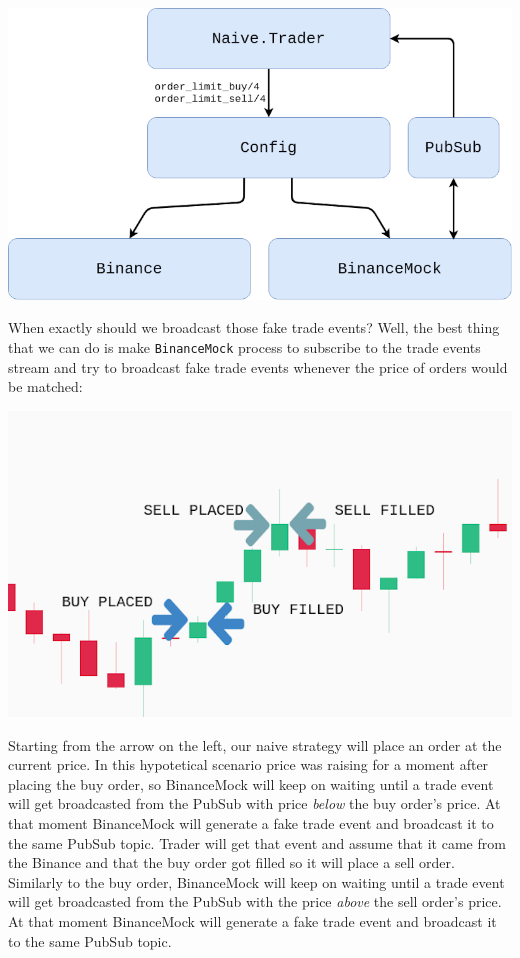 \documentclass[
  oneside]{book}
\begin{document}
\includegraphics{images/chapter_04_03_proposal_pubsub.png}

When exactly should we broadcast those fake trade events? Well, the best thing
that we can do is make \texttt{BinanceMock} process to subscribe to the trade events stream and try to broadcast fake trade events whenever the price of orders would be matched:

\includegraphics{images/chapter_04_04_explenation.png}

Starting from the arrow on the left, our naive strategy will place an order at the current price.
In this hypotetical scenario price was raising for a moment after placing the buy order, so BinanceMock will keep on waiting until a trade event will get broadcasted from the PubSub with price \emph{below} the buy order's price. At that moment BinanceMock will generate a fake trade event and broadcast it to the same PubSub topic.
Trader will get that event and assume that it came from the Binance and that the buy order got filled so it will place a sell order.
Similarly to the buy order, BinanceMock will keep on waiting until a trade event will get broadcasted from the PubSub with the price \emph{above} the sell order's price. At that moment BinanceMock will generate a fake trade event and broadcast it to the same PubSub topic.
\end{document}
